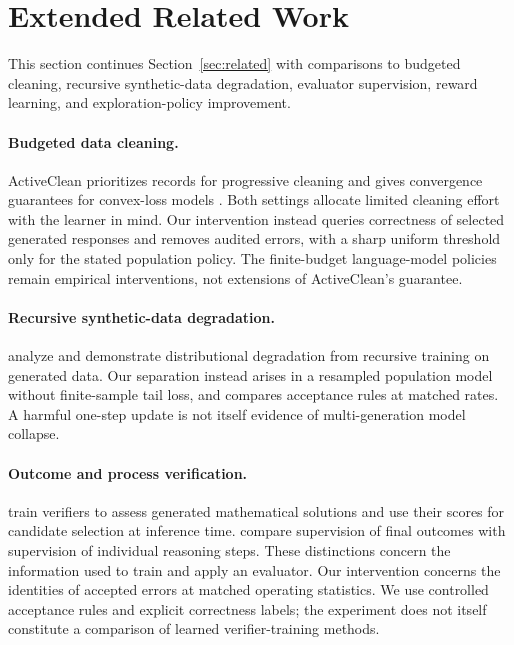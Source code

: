 \section{Extended Related Work}
\label{app:extended-related-work}

This section continues Section~\ref{sec:related} with comparisons to budgeted
cleaning, recursive synthetic-data degradation, evaluator supervision,
reward learning, and exploration-policy improvement.

\paragraph{Budgeted data cleaning.}
ActiveClean prioritizes records for progressive cleaning and gives
convergence guarantees for convex-loss models \citep{krishnan2016activeclean}.
Both settings allocate limited cleaning effort with the learner in mind.
Our intervention instead queries correctness of selected generated responses and
removes audited errors, with a sharp uniform threshold only for the stated
population policy. The finite-budget language-model policies remain
empirical interventions, not extensions of ActiveClean's guarantee.

\paragraph{Recursive synthetic-data degradation.}
\citet{shumailov2024collapse} analyze and demonstrate distributional
degradation from recursive training on generated data. Our separation
instead arises in a resampled population model without finite-sample
tail loss, and compares acceptance rules at matched rates. A harmful
one-step update is not itself evidence of multi-generation model collapse.

\paragraph{Outcome and process verification.}
\citet{cobbe2021verifiers} train verifiers to assess generated mathematical
solutions and use their scores for candidate selection at inference time.
\citet{lightman2023verify} compare supervision of final outcomes with
supervision of individual reasoning steps. These distinctions concern the
information used to train and apply an evaluator. Our intervention concerns
the identities of accepted errors at matched operating statistics. We use
controlled acceptance rules and explicit correctness labels; the experiment
does not itself constitute a comparison of learned verifier-training methods.

